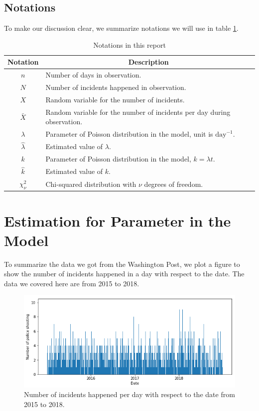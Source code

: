 \documentclass[11pt,a4paper,english]{article}
\begin{document}
\subsection{Notations}
To make our discussion clear, we summarize notations we will use in table \ref{tab:notation}.
\begin{table}[htbp]
	\centering
	\begin{tabular}{cl}
		\toprule
		Notation & \multicolumn{1}{c}{Description}\\
		\midrule
		$n$ & Number of days in observation.\\
		$N$ & Number of incidents happened in observation.\\
		$X$ & Random variable for the number of incidents.\\
		$\bar{X}$ & Random variable for the number of incidents per day during observation.\\
		$\lambda$ & Parameter of Poisson distribution in the model, unit is $\text{day}^{-1}$.\\
		$\hat{\lambda}$ & Estimated value of $\lambda$.\\
		$k$ & Parameter of Poisson distribution in the model, $k = \lambda t$.\\
		$\hat{k}$ & Estimated value of $k$.\\
		$\chi_{\nu}^{2}$ & Chi-squared distribution with $\nu$ degrees of freedom.\\
		\bottomrule
	\end{tabular}
	\caption{Notations in this report}
	\label{tab:notation}
\end{table}

\section{Estimation for Parameter in the Model}
To summarize the data we got from the Washington Post, we plot a figure to show the number of incidents happened in a day with respect to the date. The data we covered here are from 2015 to 2018.
\begin{figure}[htbp]
	\centering
	\includegraphics[width = \textwidth]{1.png}
    \caption{Number of incidents happened per day with respect to the date from 2015 to 2018.}
\end{figure}
\end{document}
